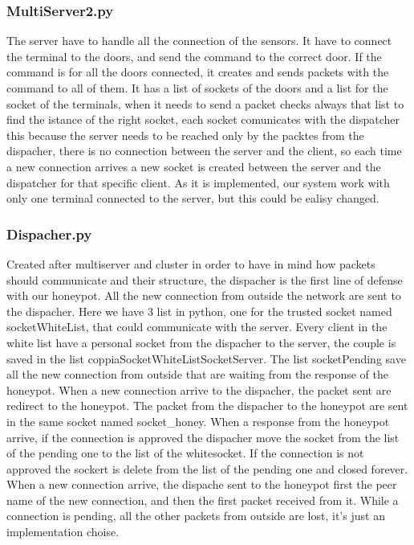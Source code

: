 \subsubsection{MultiServer2.py}
The server have to handle all the connection of the sensors. It have to connect the terminal to the doors, and send the command to the correct door. If the command is for all the doors connected, it creates and sends  packets with the command to all of them. It has a list of sockets of the doors and a list for the socket of the terminals, when it needs to send a packet checks always that list to find the istance of the right socket, each socket comunicates with the dispatcher this because the server needs to be reached only by the packtes from the dispacher, there is no connection between the server and the client, so each time a new connection arrives  a new socket is created between the server and the dispatcher for that specific client.
 As it is implemented, our system work with only one terminal connected to the server, but this could be ealisy changed. 


\subsubsection{Dispacher.py}
Created after multiserver and cluster in order to have in mind how packets should communicate and their structure, the dispacher is the first line of defense with our honeypot. All the new connection from outside the network are sent to the dispacher. Here we have 3 list in python, one for the trusted socket named socketWhiteList, that could communicate with the server. Every client in the white list have a personal socket from the dispacher to the server, the couple is saved in the list coppiaSocketWhiteListSocketServer. The list socketPending save all the new connection from outside that are waiting from the response of the honeypot. When a new connection arrive to the dispacher, the packet sent are redirect to the honeypot. The packet from the dispacher to the honeypot are sent in the same socket named socket\_honey. When a response from the honeypot arrive, if the connection is approved the dispacher move the socket from the list of the pending one to the list of the whitesocket. If the connection is not approved the sockert is delete from the list of the pending one and closed forever.  When a new connection arrive, the dispache sent to the honeypot first the peer name of the new connection, and then the first packet received from it. While a connection is pending, all the other packets from outside are lost, it's just an implementation choise.

